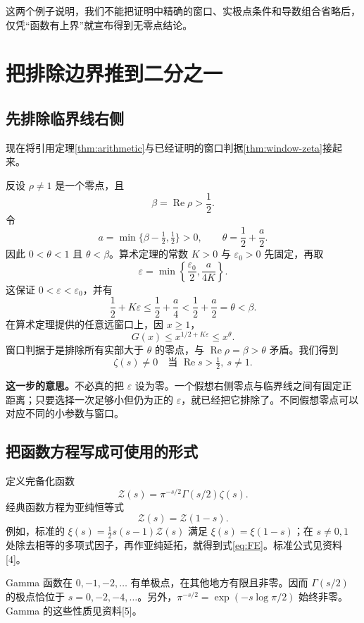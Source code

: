 \documentclass[UTF8,fontset=fandol,a4paper,openany,oneside]{ctexbook}
\theoremstyle{definition}
\theoremstyle{remark}
\newcommand{\Rea}{\operatorname{Re}}
\newcommand{\Expl}[1]{\par\smallskip\noindent\textbf{这一步的意思。}#1\par\smallskip}
\begin{document}
这两个例子说明，我们不能把证明中精确的窗口、实极点条件和导数组合省略后，仅凭“函数有上界”就宣布得到无零点结论。



\chapter{把排除边界推到二分之一}
\label{chap:finish}
\section{先排除临界线右侧}
现在将引用定理\ref{thm:arithmetic}与已经证明的窗口判据\ref{thm:window-zeta}接起来。

反设 $\rho\ne1$ 是一个零点，且
\[
\beta=\Rea\rho>\frac12.
\]
令
\[
a=\min\{\beta-\tfrac12,\tfrac12\}>0,
\qquad \theta=\frac12+\frac a2.
\]
因此 $0<\theta<1$ 且 $\theta<\beta$。算术定理的常数 $K>0$ 与 $\varepsilon_0>0$ 先固定，再取
\begin{equation}
\varepsilon=\min\left\{\frac{\varepsilon_0}{2},\frac{a}{4K}\right\}.
\label{eq:eps-final}
\end{equation}
这保证 $0<\varepsilon<\varepsilon_0$，并有
\[
\frac12+K\varepsilon\le\frac12+\frac a4
<\frac12+\frac a2=\theta<\beta.
\]
在算术定理提供的任意远窗口上，因 $x\ge1$，
\[
G(x)\le x^{1/2+K\varepsilon}\le x^\theta.
\]
窗口判据于是排除所有实部大于 $\theta$ 的零点，与 $\Rea\rho=\beta>\theta$ 矛盾。我们得到
\begin{equation}
\boxed{\zeta(s)\ne0\quad\text{当 }\Rea s>\tfrac12,\ s\ne1.}
\label{eq:right-free}
\end{equation}

\Expl{不必真的把 $\varepsilon$ 设为零。一个假想右侧零点与临界线之间有固定正距离；只要选择一次足够小但仍为正的 $\varepsilon$，就已经把它排除了。不同假想零点可以对应不同的小参数与窗口。}

\section{把函数方程写成可使用的形式}
定义完备化函数
\[
\mathcal Z(s)=\pi^{-s/2}\Gamma(s/2)\zeta(s).
\]
经典函数方程为亚纯恒等式
\begin{equation}
\mathcal Z(s)=\mathcal Z(1-s).
\label{eq:FE}
\end{equation}
例如，标准的 $\xi(s)=\tfrac12s(s-1)\mathcal Z(s)$ 满足
$\xi(s)=\xi(1-s)$；在 $s\ne0,1$ 处除去相等的多项式因子，再作亚纯延拓，就得到式\eqref{eq:FE}。标准公式见资料[4]。

Gamma 函数在 $0,-1,-2,\ldots$ 有单极点，在其他地方有限且非零。因而 $\Gamma(s/2)$ 的极点恰位于 $s=0,-2,-4,\ldots$。另外，$\pi^{-s/2}=\exp(-s\log\pi/2)$ 始终非零。Gamma 的这些性质见资料[5]。
\end{document}
